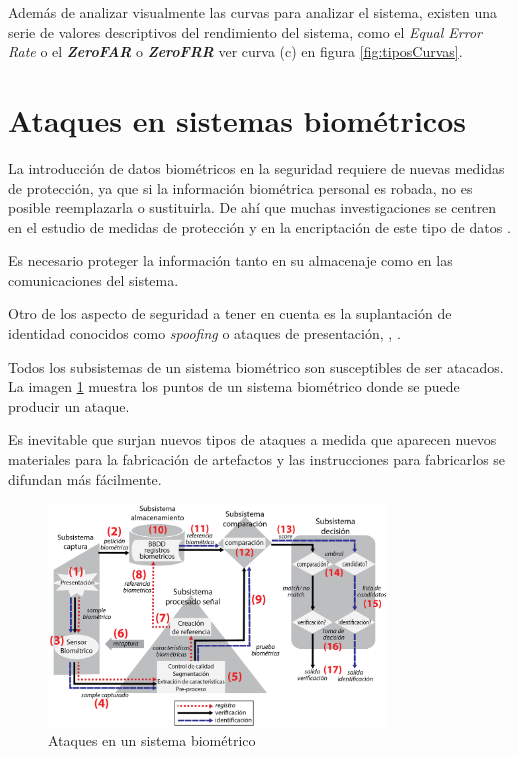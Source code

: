Además de analizar visualmente las curvas para analizar el sistema, existen una serie de valores descriptivos del rendimiento del sistema, como el \textit{Equal Error Rate} \textbf{} o el \textbf{\textit{\Gls{ZeroFAR}}} o \textbf{\textit{\Gls{ZeroFRR}}} ver curva (c) en figura \ref{fig:tiposCurvas}.


\section{Ataques en sistemas biométricos}\label{sec:AtaquesSistemasbiometricos}

La introducción de datos biométricos en la seguridad requiere de nuevas medidas de protección, ya que si la información biométrica personal es robada, no es posible reemplazarla o sustituirla. De ahí que muchas investigaciones se centren en el estudio de medidas de protección y en la encriptación de este tipo de datos \cite{barni2010privacy} \cite{sasse2013usable}. 

Es necesario proteger la información tanto en su almacenaje como en las comunicaciones del sistema.

Otro de los aspecto de seguridad a tener en cuenta es la suplantación de identidad conocidos como \textit{\gls{spoofing}} o ataques de presentación, \cite{marcel2014handbook} \cite{marcel2019handbook}, \cite{ISO/PADFramework}.

Todos los subsistemas de un sistema biométrico son susceptibles de ser atacados. La imagen \ref{fig:esquemaSistemaBiometricoAtaques} muestra los puntos de un sistema biométrico donde se puede producir un ataque.

Es inevitable que surjan nuevos tipos de ataques a medida que aparecen nuevos materiales para la fabricación de artefactos y las instrucciones para fabricarlos se difundan más fácilmente.

\begin{figure}[t]
    \centering
    \includegraphics[width=0.8\textwidth]{ch-sistemasABC/images/ch-sistemasBiometricos/esquemaSistemaBiometricosAtaques.png}
    \caption{Ataques en un sistema biométrico \cite{ISO/Biometric}}
    \label{fig:esquemaSistemaBiometricoAtaques}
\end{figure}

